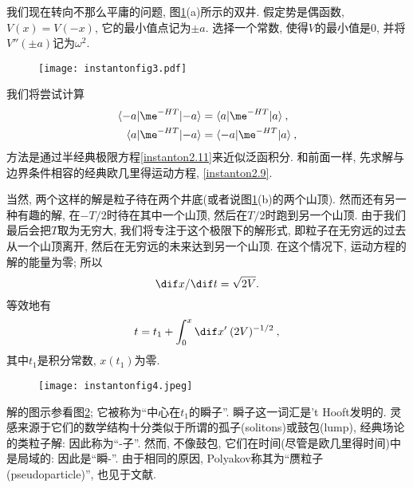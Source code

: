 我们现在转向不那么平庸的问题, 图\ref{instantonfig3}(a)所示的双井. 假定势是偶函数, $V(x)=V(-x)$, 它的最小值点记为$\pm a$. 选择一个常数, 使得$V$的最小值是0, 并将$V''(\pm a)$记为$\omega^{2}$.
\begin{figure}[h]
    \centering
    \texttt{[image: instantonfig3.pdf]}
    \caption{ \label{instantonfig3}}
\end{figure}

我们将尝试计算
\begin{subequations}
    \begin{align}
        \langle {-}a \vert \me^{-HT} \vert {-}a \rangle &= \langle a \vert \me^{-HT} \vert a \rangle \:, \label{instanton2.19a}\\ 
        \langle a \vert \me^{-HT} \vert {-}a \rangle &= \langle {-}a \vert \me^{-HT} \vert a \rangle \:,\label{instanton2.19b}
    \end{align}
\end{subequations}
方法是通过半经典极限方程\eqref{instanton2.11}来近似泛函积分. 和前面一样, 先求解与边界条件相容的经典欧几里得运动方程, \eqref{instanton2.9}. 

当然, 两个这样的解是粒子待在两个井底(或者说图\ref{instantonfig3}(b)的两个山顶). 然而还有另一种有趣的解, 在$-T/2$时待在其中一个山顶, 然后在$T/2$时跑到另一个山顶.
由于我们最后会把$T$取为无穷大, 我们将专注于这个极限下的解形式, 即粒子在无穷远的过去从一个山顶离开, 然后在无穷远的未来达到另一个山顶. 在这个情况下, 运动方程的解的能量为零; 
所以
\begin{equation}
    \dif x/\dif t =\sqrt{2V}. \label{instanton2.20}
\end{equation}
等效地有
\begin{equation}
    t= t_{1}+\int_{0}^{x}\dif x' \: (2V)^{-1/2} \:, \label{instanton2.21}
\end{equation}
其中$t_{1}$是积分常数, $x(t_{1})$为零.

\begin{figure}[h]
    \centering
    \texttt{[image: instantonfig4.jpeg]}
    \caption{ \label{instantonfig4}}
  \end{figure}

解的图示参看图\ref{instantonfig4}; 它被称为``中心在$t_{1}$的瞬子''. 瞬子这一词汇是't Hooft发明的. 灵感来源于它们的数学结构十分类似于所谓的孤子(solitons)或鼓包(lump), 
经典场论的类粒子解: 因此称为``-子''. 然而, 不像鼓包, 它们在时间(尽管是欧几里得时间)中是局域的: 因此是``瞬-''. 由于相同的原因, Polyakov称其为``赝粒子(pseudoparticle)'', 也见于文献.

